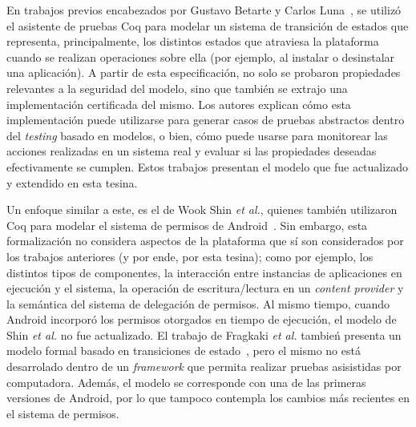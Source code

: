 En trabajos previos encabezados por Gustavo Betarte y Carlos Luna~\cite{betarte-2017, betarte-2016,
    luna-cleiej}, se utilizó el asistente de pruebas Coq para modelar un sistema de transición de
estados que representa, principalmente, los distintos estados que atraviesa la plataforma cuando se
realizan operaciones sobre ella (por ejemplo, al instalar o desinstalar una aplicación). A partir de
esta especificación, no solo se probaron propiedades relevantes a la seguridad del modelo, sino que
también se extrajo una implementación certificada del mismo. Los autores explican cómo esta
implementación puede utilizarse para generar casos de pruebas abstractos dentro del \textit{testing}
basado en modelos, o bien, cómo puede usarse para monitorear las acciones realizadas en un sistema
real y evaluar si las propiedades deseadas efectivamente se cumplen. Estos trabajos presentan el
modelo que fue actualizado y extendido en esta tesina.

Un enfoque similar a este, es el de Wook Shin \textit{et al.}, quienes también utilizaron Coq para
modelar el sistema de permisos de Android~\cite{shin}. Sin embargo, esta formalización no considera
aspectos de la plataforma que sí son considerados por los trabajos anteriores (y por ende, por esta
tesina); como por ejemplo, los distintos tipos de componentes, la interacción entre instancias de
aplicaciones en ejecución y el sistema, la operación de escritura/lectura en un \textit{content
    provider} y la semántica del sistema de delegación de permisos. Al mismo tiempo, cuando Android
incorporó los permisos otorgados en tiempo de ejecución,  el modelo  de Shin \textit{et al.} no fue
actualizado. El trabajo de Fragkaki \textit{et al.} tambień presenta un modelo formal basado en
transiciones de estado~\cite{fragkaki}, pero el mismo no está desarrolado dentro de un
\textit{framework} que permita realizar pruebas asisistidas por computadora. Además, el modelo se
corresponde con una de las primeras versiones de Android, por lo que tampoco contempla los cambios
más recientes en el sistema de permisos.